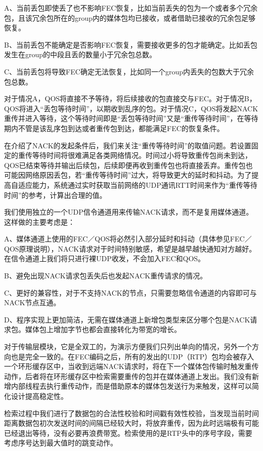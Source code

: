 \documentclass[onecolumn]{article}
\begin{document}
\begin{CJK*}{UTF8}{gbsn}
		A、当前丢包即使丢了也不影响FEC恢复，比如当前丢失的包为一个或者多个冗余包，且该冗余包所在的group内的媒体包均已接收，或者借助已接收的冗余包足够恢复。
		
		B、当前丢包不能确定是否影响FEC恢复，需要接收更多的包才能确定。比如丢包发生在group的中段且丢的数量小于冗余包总数。
		
		C、当前丢包将导致FEC确定无法恢复，比如同一个group内丢失的包数大于冗余包总数。
		
		对于情况A，QOS将直接不予等待，将后续接收的包直接交与FEC。对于情况B，QOS将进入“丢包等待时间”，以期收到乱序的包。对于情况C，QOS将发起NACK重传并进入等待，这个等待时间即是“丢包等待时间”又是“重传等待时间”，在等待期内不管是该乱序包到达或者重传包到达，都能满足FEC的恢复条件。
		
		在介绍了NACK的发起条件后，我们来关注“重传等待时间”的取值问题。若设置固定的重传等待时间将很难满足各类网络情况。时间过小将导致重传包尚未到达，QOS已结束等待并输出后续包，后续即便再收到重传包也将直接丢弃。重传包也可能因网络原因丢包，若“重传等待时间”过大，将导致更大的延时和抖动。为了提高自适应能力，系统通过实时获取当前网络的UDP通讯RTT时间来作为“重传等待时间”的参考，计算出合理的值。
		
		我们使用独立的一个UDP信令通道用来传输NACK请求，而不是复用媒体通道。这样做的主要考虑是：
		
		A、媒体通道上使用的FEC／QOS将必然引入部分延时和抖动（具体参见FEC／QOS原理说明），NACK请求对于时间特别敏感，希望是越早越快通知对方越好。在信令通道上我们将只进行裸UDP收发，不会加入FEC和QOS。
		
		B、避免出现NACK请求包丢失后也发起NACK重传请求的情况。
		
		C、更好的兼容性，对于不支持NACK的节点，只需要忽略信令通道的内容即可与NACK节点互通。
		
		D、程序实现上更加简洁，无需在媒体通道上新增包类型来区分哪个包是NACK请求包。媒体包上增加字节也都会直接转化为带宽的增长。
		
		对于传输层模块，它是全双工的，为演示方便我们只列出单向的情况，另外一个方向也是完全一致的。在FEC编码之后，所有的发出的UDP（RTP）包均会被存入一个环形缓存区中，当收到远端NACK请求时，将在下一个媒体包传输时触发重传动作，后者将在环形缓存区中检索需要重传的包并在媒体通道上发出。我们没有新增内部线程去执行重传动作，而是借助原本的媒体包发送行为来触发，这样可以简化设计提高稳定性。
		
		检索过程中我们进行了数据包的合法性校验和时间戳有效性校验，当发现当前时间距离数据包初次发送时间的间隔已经较大时，将放弃重传，因为此时远端极有可能已经退出等待，没有必要再浪费带宽。检索使用的是RTP头中的序号字段，需要考虑序号达到最大值时的跳变动作。
		

\end{CJK*}
\end{document}

